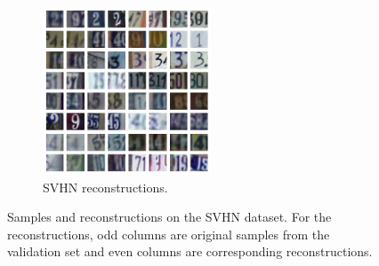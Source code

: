 \documentclass{article}
\newcommand{\figureHeight}{5cm}
\begin{document}
\begin{figure}[p]
\begin{subfigure}[t]{0.49\textwidth}
        \includegraphics[height=\figureHeight]{svhn_reconstructions.png}
        \caption{\label{fig:svhn_reconstructions} SVHN reconstructions.}
    \end{subfigure}
    \caption{\label{fig:svhn_images} Samples and reconstructions on the SVHN
        dataset. For the reconstructions, odd columns are
        original samples from the validation set and even columns are
        corresponding reconstructions.}
\end{figure}
\end{document}
